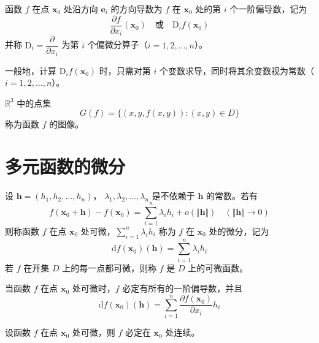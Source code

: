 \begin{definition}
    函数 $f$ 在点 $\bm{x}_0$ 处沿方向 $\bm{e}_i$ 的方向导数为 $f$ 在 $\bm{x}_0$ 处的第 $i$ 个一阶偏导数，记为
    \[
        \frac{\partial f}{\partial x_i}(\bm{x}_0) \quad \text{或} \quad \mathrm{D}_{i}f(\bm{x}_0)
    \]
    并称 $\mathrm{D}_i = \dfrac{\partial}{\partial x_i}$ 为第 $i$ 个偏微分算子（$i = 1, 2, \ldots, n$）。
\end{definition}

\begin{remark}
    一般地，计算 $\mathrm{D}_{i}f(\bm{x}_0)$ 时，只需对第 $i$ 个变数求导，同时将其余变数视为常数（$i = 1, 2, \ldots, n$）。
\end{remark}

\begin{definition}
    $\mathbb{R}^3$ 中的点集
    \[
        G(f) = \{(x, y, f(x, y)): (x, y) \in D\}
    \]
    称为函数 $f$ 的图像。
\end{definition}




\section{多元函数的微分}

\begin{definition}
    设 $\bm{h} = (h_1, h_2, \ldots, h_n)$， $\lambda_1, \lambda_2, \ldots, \lambda_n$ 是不依赖于 $\bm{h}$ 的常数。若有
    \[
        f(\bm{x}_0 + \bm{h}) - f(\bm{x}_0) = \sum_{i = 1}^{n}\lambda_{i}h_{i} + o(\Vert \bm{h} \Vert) \quad (\Vert \bm{h} \Vert \to 0)
    \]
    则称函数 $f$ 在点 $\bm{x}_0$ 处可微，$\displaystyle \sum_{i = 1}^{n}\lambda_{i}h_{i}$ 称为 $f$ 在 $\bm{x}_0$ 处的微分，记为
    \[
        \mathrm{d}f(\bm{x}_0)(\bm{h}) = \sum_{i = 1}^{n}\lambda_{i}h_{i}
    \]
    若 $f$ 在开集 $D$ 上的每一点都可微，则称 $f$ 是 $D$ 上的可微函数。
\end{definition}

\begin{remark}
    当函数 $f$ 在点 $\bm{x}_0$ 处可微时，$f$ 必定有所有的一阶偏导数，并且
    \[
        \mathrm{d}f(\bm{x}_0)(\bm{h}) = \sum_{i = 1}^{n}\frac{\partial f(\bm{x}_0)}{\partial x_i}h_i
    \]
\end{remark}

\begin{theorem}
    设函数 $f$ 在点 $\bm{x}_0$ 处可微，则 $f$ 必定在 $\bm{x}_0$ 处连续。
\end{theorem}

